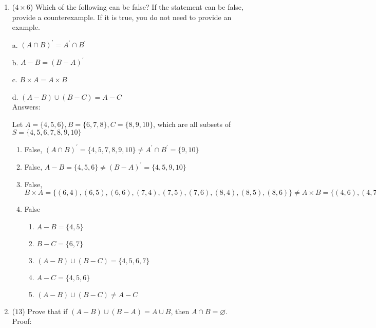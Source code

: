\documentclass[12pt]{article}
\begin{document}
\begin{enumerate}
		\item ($4 \times 6$)
		Which of the following can be false? If the statement can be false, provide a counterexample. If it is true, you do not need to provide an example.

		a. $\left(A \cap B\right)^{\prime} = A^{\prime} \cap B^{\prime}$

		b. $A - B = \left(B - A\right)^{\prime}$

		c. $B \times A = A \times B$

		d. $\left(A - B\right) \cup \left(B - C\right) = A - C$
		\\Answers:


		Let $A = \{4, 5, 6\}, B = \{6, 7, 8\}, C = \{8, 9, 10\}$, which are all subsets of $S = \{4, 5, 6, 7, 8, 9, 10\}$
		\begin{enumerate}
			\item False, $(A \cap B)^{\prime} = \{4, 5, 7, 8, 9, 10\} \neq A^{\prime} \cap B^{\prime} = \{9, 10\}$
			\item False, $A - B = \{4, 5, 6\} \neq (B - A)^{\prime} = \{4, 5, 9, 10\}$
			\item False, $B \times A = \{(6,4), (6,5), (6,6), (7,4), (7,5), (7,6), (8,4), (8,5), (8,6)\} \neq A \times B = \{(4,6), (4,7), (4,8), (5,6), (5,7), (5,8), (6,6), (6,7), (6,8)\}$
			\item False
			\begin{enumerate}
				\item $A - B = \{4,5\}$
				\item $B - C = \{6,7\}$
				\item $(A - B) \cup (B - C) = \{4,5,6,7\}$
				\item $A - C = \{4,5,6\}$
				\item $(A - B) \cup (B - C) \neq A - C$
			\end{enumerate}
		\end{enumerate}
		\clearpage
		\item ($13$) Prove that if $\left(A - B\right) \cup \left(B - A\right) = A \cup B$, then $A \cap B = \varnothing$. \\

		Proof:
	\end{enumerate}
\end{document}
